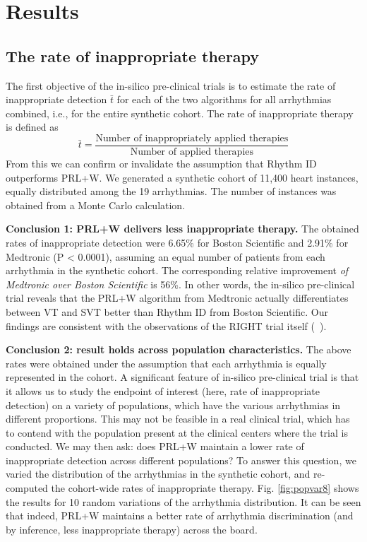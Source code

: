 \section{Results}

\subsection{The rate of inappropriate therapy}
\label{sec:rate inapp}
The first objective of the in-silico pre-clinical trials is to estimate the rate of inappropriate detection $\bar{t}$ for each of the two algorithms for all arrhythmias combined, i.e., for the entire synthetic cohort.
The rate of inappropriate therapy is defined as
\[\bar{t} = \frac{\text{Number of inappropriately applied therapies}}{\text{Number of applied therapies}}\]
From this we can confirm or invalidate the assumption that Rhythm ID outperforms PRL+W.
We generated a synthetic cohort of 11,400 heart instances, equally distributed among the 19 arrhythmias.
The number of instances was obtained from a Monte Carlo calculation.%

\textbf{Conclusion 1: PRL+W delivers less inappropriate therapy.}
The obtained rates of inappropriate detection were 6.65\% for Boston Scientific and 2.91\% for Medtronic (P < 0.0001), assuming an equal number of patients from each arrhythmia in the synthetic cohort.
The corresponding relative improvement \emph{of Medtronic over Boston Scientific} is 56\%.
In other words, the in-silico pre-clinical trial reveals that the PRL+W algorithm from Medtronic actually differentiates between VT and SVT better than Rhythm ID from Boston Scientific.
Our findings are consistent with the observations of the RIGHT trial itself (~\cite{GoldABBTB11_RIGHTresults}).

\textbf{Conclusion 2: result holds across population characteristics.}
The above rates were obtained under the assumption that each arrhythmia is equally represented in the cohort.
A significant feature of in-silico pre-clinical trial is that it allows us to study the endpoint of interest (here, rate of inappropriate detection) on a variety of populations, which have the various arrhythmias in different proportions.
This may not be feasible in a real clinical trial, which has to contend with the population present at the clinical centers where the trial is conducted.
We may then ask: does PRL+W maintain a lower rate of inappropriate detection across different populations?
To answer this question, we varied the distribution of the arrhythmias in the synthetic cohort, and re-computed the cohort-wide rates of inappropriate therapy.
Fig. \ref{fig:popvar8} shows the results for 10 random variations of the arrhythmia distribution.
It can be seen that indeed, PRL+W maintains a better rate of arrhythmia discrimination (and by inference, less inappropriate therapy) across the board.

